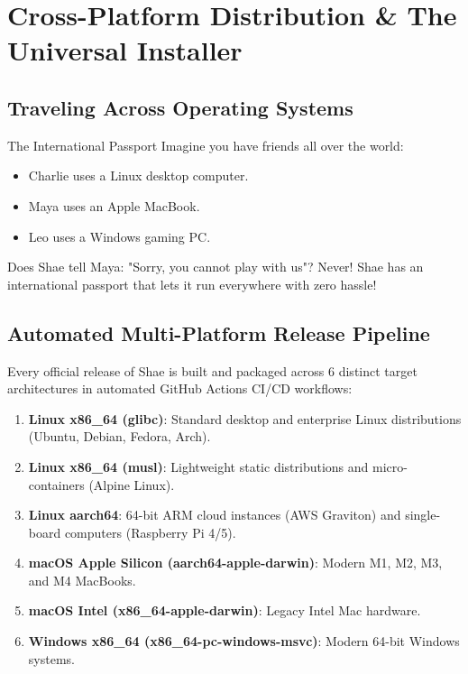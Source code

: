 \chapter{Cross-Platform Distribution \& The Universal Installer}

\section{Traveling Across Operating Systems}

\begin{kidbox}{The International Passport}
Imagine you have friends all over the world:
\begin{itemize}
    \item Charlie uses a Linux desktop computer.
    \item Maya uses an Apple MacBook.
    \item Leo uses a Windows gaming PC.
\end{itemize}
Does Shae tell Maya: "Sorry, you cannot play with us"? Never!
Shae has an international passport that lets it run everywhere with zero hassle!
\end{kidbox}

\section{Automated Multi-Platform Release Pipeline}

Every official release of Shae is built and packaged across 6 distinct target architectures in automated GitHub Actions CI/CD workflows:
\begin{enumerate}
    \item \textbf{Linux x86\_64 (glibc)}: Standard desktop and enterprise Linux distributions (Ubuntu, Debian, Fedora, Arch).
    \item \textbf{Linux x86\_64 (musl)}: Lightweight static distributions and micro-containers (Alpine Linux).
    \item \textbf{Linux aarch64}: 64-bit ARM cloud instances (AWS Graviton) and single-board computers (Raspberry Pi 4/5).
    \item \textbf{macOS Apple Silicon (aarch64-apple-darwin)}: Modern M1, M2, M3, and M4 MacBooks.
    \item \textbf{macOS Intel (x86\_64-apple-darwin)}: Legacy Intel Mac hardware.
    \item \textbf{Windows x86\_64 (x86\_64-pc-windows-msvc)}: Modern 64-bit Windows systems.
\end{enumerate}

